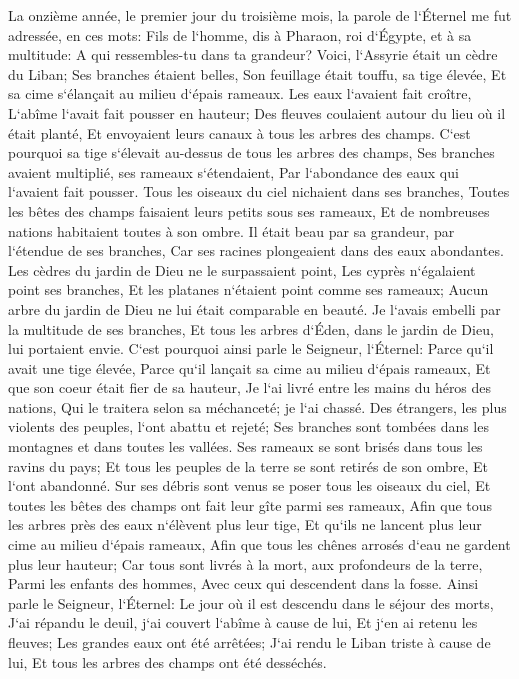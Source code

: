 \verse La onzième année, le premier jour du troisième mois, la parole de l`Éternel me fut adressée, en ces mots: 
\verse Fils de l`homme, dis à Pharaon, roi d`Égypte, et à sa multitude: A qui ressembles-tu dans ta grandeur? 
\verse Voici, l`Assyrie était un cèdre du Liban; Ses branches étaient belles, Son feuillage était touffu, sa tige élevée, Et sa cime s`élançait au milieu d`épais rameaux. 
\verse Les eaux l`avaient fait croître, L`abîme l`avait fait pousser en hauteur; Des fleuves coulaient autour du lieu où il était planté, Et envoyaient leurs canaux à tous les arbres des champs. 
\verse C`est pourquoi sa tige s`élevait au-dessus de tous les arbres des champs, Ses branches avaient multiplié, ses rameaux s`étendaient, Par l`abondance des eaux qui l`avaient fait pousser. 
\verse Tous les oiseaux du ciel nichaient dans ses branches, Toutes les bêtes des champs faisaient leurs petits sous ses rameaux, Et de nombreuses nations habitaient toutes à son ombre. 
\verse Il était beau par sa grandeur, par l`étendue de ses branches, Car ses racines plongeaient dans des eaux abondantes. 
\verse Les cèdres du jardin de Dieu ne le surpassaient point, Les cyprès n`égalaient point ses branches, Et les platanes n`étaient point comme ses rameaux; Aucun arbre du jardin de Dieu ne lui était comparable en beauté. 
\verse Je l`avais embelli par la multitude de ses branches, Et tous les arbres d`Éden, dans le jardin de Dieu, lui portaient envie. 
\verse C`est pourquoi ainsi parle le Seigneur, l`Éternel: Parce qu`il avait une tige élevée, Parce qu`il lançait sa cime au milieu d`épais rameaux, Et que son coeur était fier de sa hauteur, 
\verse Je l`ai livré entre les mains du héros des nations, Qui le traitera selon sa méchanceté; je l`ai chassé. 
\verse Des étrangers, les plus violents des peuples, l`ont abattu et rejeté; Ses branches sont tombées dans les montagnes et dans toutes les vallées. Ses rameaux se sont brisés dans tous les ravins du pays; Et tous les peuples de la terre se sont retirés de son ombre, Et l`ont abandonné. 
\verse Sur ses débris sont venus se poser tous les oiseaux du ciel, Et toutes les bêtes des champs ont fait leur gîte parmi ses rameaux, 
\verse Afin que tous les arbres près des eaux n`élèvent plus leur tige, Et qu`ils ne lancent plus leur cime au milieu d`épais rameaux, Afin que tous les chênes arrosés d`eau ne gardent plus leur hauteur; Car tous sont livrés à la mort, aux profondeurs de la terre, Parmi les enfants des hommes, Avec ceux qui descendent dans la fosse. 
\verse Ainsi parle le Seigneur, l`Éternel: Le jour où il est descendu dans le séjour des morts, J`ai répandu le deuil, j`ai couvert l`abîme à cause de lui, Et j`en ai retenu les fleuves; Les grandes eaux ont été arrêtées; J`ai rendu le Liban triste à cause de lui, Et tous les arbres des champs ont été desséchés. 
